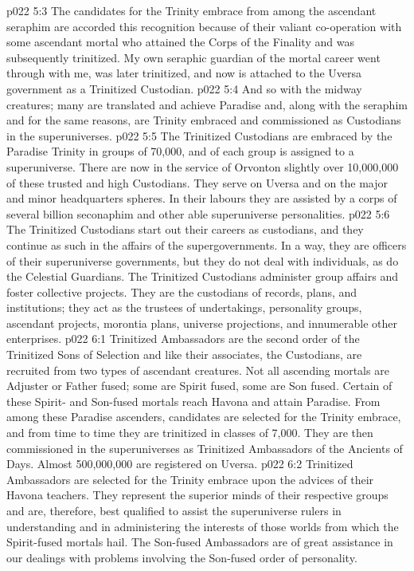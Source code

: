 \vs p022 5:3 The candidates for the Trinity embrace from among the ascendant seraphim are accorded this recognition because of their valiant co\hyp{}operation with some ascendant mortal who attained the Corps of the Finality and was subsequently trinitized. My own seraphic guardian of the mortal career went through with me, was later trinitized, and now is attached to the Uversa government as a Trinitized Custodian.
\vs p022 5:4 And so with the midway creatures; many are translated and achieve Paradise and, along with the seraphim and for the same reasons, are Trinity embraced and commissioned as Custodians in the superuniverses.
\vs p022 5:5 The Trinitized Custodians are embraced by the Paradise Trinity in groups of 70,000, and  of each group is assigned to a superuniverse. There are now in the service of Orvonton slightly over 10,000,000 of these trusted and high Custodians. They serve on Uversa and on the major and minor headquarters spheres. In their labours they are assisted by a corps of several billion seconaphim and other able superuniverse personalities.
\vs p022 5:6 The Trinitized Custodians start out their careers as custodians, and they continue as such in the affairs of the supergovernments. In a way, they are officers of their superuniverse governments, but they do not deal with individuals, as do the Celestial Guardians. The Trinitized Custodians administer group affairs and foster collective projects. They are the custodians of records, plans, and institutions; they act as the trustees of undertakings, personality groups, ascendant projects, morontia plans, universe projections, and innumerable other enterprises.
\vs p022 6:1 Trinitized Ambassadors are the second order of the Trinitized Sons of Selection and like their associates, the Custodians, are recruited from two types of ascendant creatures. Not all ascending mortals are Adjuster or Father fused; some are Spirit fused, some are Son fused. Certain of these Spirit\hyp{} and Son\hyp{}fused mortals reach Havona and attain Paradise. From among these Paradise ascenders, candidates are selected for the Trinity embrace, and from time to time they are trinitized in classes of 7,000. They are then commissioned in the superuniverses as Trinitized Ambassadors of the Ancients of Days. Almost 500,000,000 are registered on Uversa.
\vs p022 6:2 Trinitized Ambassadors are selected for the Trinity embrace upon the advices of their Havona teachers. They represent the superior minds of their respective groups and are, therefore, best qualified to assist the superuniverse rulers in understanding and in administering the interests of those worlds from which the Spirit\hyp{}fused mortals hail. The Son\hyp{}fused Ambassadors are of great assistance in our dealings with problems involving the Son\hyp{}fused order of personality.
